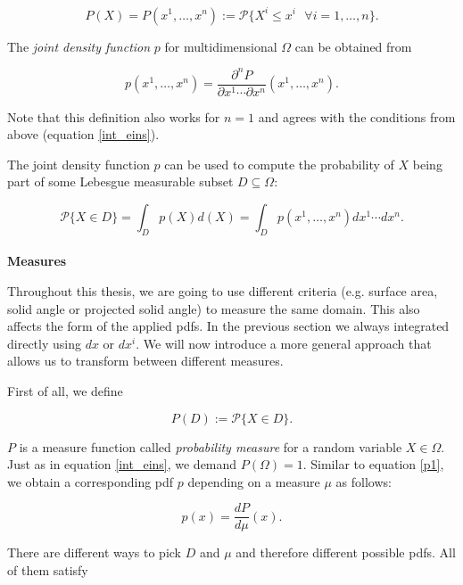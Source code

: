 \begin{equation*}
P(X) = P(x^1,\dots,x^n) := \mathcal{P}\{X^i \leq x^i \text{ }\forall i = 1,\dots,n\}.
\end{equation*}

The \emph{joint density function} $p$ for multidimensional $\Omega$ can be obtained from

\begin{equation}
\label{p1}
p(x^1,\dots,x^n) = \frac{\partial ^n P}{\partial x^1 \cdots \partial x^n}(x^1,\dots,x^n).
\end{equation}

Note that this definition also works for $n=1$ and agrees with the conditions from above (equation \ref{int_eins}).

The joint density function $p$ can be used to compute the probability of $X$ being part of some Lebesgue measurable subset $D\subseteq \Omega$:

\begin{equation*}
\mathcal{P}\{X\in D\} = \int_D p(X)d(X) = \int_D p(x^1, \dots, x^n) dx^1 \cdots dx^n.
\end{equation*}\\

\textbf{Measures}

Throughout this thesis, we are going to use different criteria (e.g. surface area, solid angle or projected solid angle) to measure the same domain. This also affects the form of the applied pdfs. In the previous section we always integrated directly using $dx$ or $dx^i$. We will now introduce a more general approach that allows us to transform between different measures.

First of all, we define

\begin{equation*}
P(D) := \mathcal{P}\{X\in D\}.
\end{equation*}

$P$ is a measure function called \emph{probability measure} for a random variable $X \in \Omega$. Just as in equation \ref{int_eins}, we demand $P(\Omega) = 1$. Similar to equation \ref{p1}, we obtain a corresponding pdf $p$ depending on a measure $\mu$ as follows:

\begin{equation}
\label{def_p}
p(x) = \frac{dP}{d\mu}(x).
\end{equation}

There are different ways to pick $D$ and $\mu$ and therefore different possible pdfs. All of them satisfy

